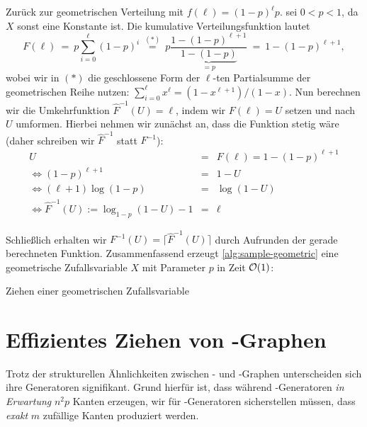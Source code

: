 Zurück  zur geometrischen Verteilung mit $f(\ell) = (1-p)^\ell p$.
\OBdA sei $0 < p < 1$, da $X$ sonst eine Konstante ist.
Die kumulative Verteilungsfunktion lautet
\begin{equation}
    F(\ell)
\ =\ p \sum_{i=0}^\ell (1-p)^i
    \ \stackrel{(*)}{=} \ p \frac{1 - (1-p)^{\ell+1}}{\underbrace{1 - (1-p)}_{=p}}
    \ = \ 1 - (1-p)^{\ell+1},
\end{equation}
wobei wir in $(*)$ die geschlossene Form der $\ell$-ten Partialsumme der geometrischen Reihe nutzen: $\sum_{i=0}^\ell x^\ell = (1 - x^{\ell+1})/(1 - x)$.
Nun berechnen wir die Umkehrfunktion $\hat F^{-1}(U) = \ell$, indem wir $F(\ell) = U$ setzen und nach $U$ umformen.
Hierbei nehmen wir zunächst an, dass die Funktion stetig wäre (daher schreiben wir $\hat F ^{-1}$ statt $F^{-1}$):
\begin{eqnarray}
    U &=& F(\ell) = 1 - (1-p)^{\ell+1} \\
    \Leftrightarrow (1-p)^{\ell+1} &=& 1 - U \\
    \Leftrightarrow  (\ell+1) \log(1-p)  &=& \log(1 - U) \\
    \Leftrightarrow  \hat F^{-1}(U) := \log_{1-p}(1 - U) - 1 &=& \ell \label{eq:inverse-hat}
\end{eqnarray}

Schließlich erhalten wir $F^{-1}(U) = \lceil \hat F^{-1} (U) \rceil$ durch Aufrunden der gerade berechneten Funktion.
Zusammenfassend erzeugt \cref{alg:sample-geometric} eine geometrische Zufallsvariable $X$ mit Parameter $p$ in Zeit $\mathcal{O}\!\left(1\right)$:

\begin{algorithm}[H]
    \Else{$U \gets \text{ziehe uniform aus $[0, 1)$}$\;
    Gebe $\lceil \log_{1-p}(1 - U) - 1\rceil$ zurück}
    \caption{Ziehen einer geometrischen Zufallsvariable}
    \label{alg:sample-geometric}
\end{algorithm}

\bigskip
\bigskip

\section{Effizientes Ziehen von \Gnm-Graphen}\label{sec:sampling_gnm}
Trotz der strukturellen Ähnlichkeiten zwischen \Gnp- und \Gnm-Graphen unterscheiden sich ihre Generatoren signifikant.
Grund hierfür ist, dass während \Gnp-Generatoren \emph{in Erwartung} $n^2p$ Kanten erzeugen, wir für \Gnm-Generatoren sicherstellen müssen, dass \emph{exakt} $m$ zufällige Kanten produziert werden.

